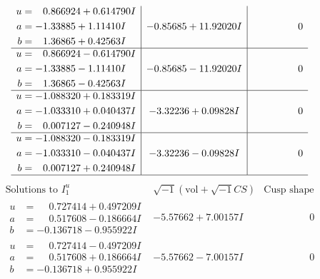 \documentclass[1p]{elsarticle_modified}
\theoremstyle{definition}
\newcommand{\I}{\sqrt{-1}}
\begin{document}
$$\begin{array}{c|c|c}
\begin{aligned}
u &= \phantom{-}0.866924 + 0.614790 I \\
a &= -1.33885 + 1.11410 I \\
b &= \phantom{-}1.36865 + 0.42563 I\end{aligned}
 & -0.85685 + 11.92020 I & \phantom{-0.000000 } 0 \\ \hline\begin{aligned}
u &= \phantom{-}0.866924 - 0.614790 I \\
a &= -1.33885 - 1.11410 I \\
b &= \phantom{-}1.36865 - 0.42563 I\end{aligned}
 & -0.85685 - 11.92020 I & \phantom{-0.000000 } 0 \\ \hline\begin{aligned}
u &= -1.088320 + 0.183319 I \\
a &= -1.033310 + 0.040437 I \\
b &= \phantom{-}0.007127 - 0.240948 I\end{aligned}
 & -3.32236 + 0.09828 I & \phantom{-0.000000 } 0 \\ \hline\begin{aligned}
u &= -1.088320 - 0.183319 I \\
a &= -1.033310 - 0.040437 I \\
b &= \phantom{-}0.007127 + 0.240948 I\end{aligned}
 & -3.32236 - 0.09828 I & \phantom{-0.000000 } 0\\
 \hline 
 \end{array}$$\newpage$$\begin{array}{c|c|c}  
\text{Solutions to }I^u_{1}& \I (\text{vol} + \sqrt{-1}CS) & \text{Cusp shape}\\
 \hline 
\begin{aligned}
u &= \phantom{-}0.727414 + 0.497209 I \\
a &= \phantom{-}0.517608 - 0.186664 I \\
b &= -0.136718 - 0.955922 I\end{aligned}
 & -5.57662 + 7.00157 I & \phantom{-0.000000 } 0 \\ \hline\begin{aligned}
u &= \phantom{-}0.727414 - 0.497209 I \\
a &= \phantom{-}0.517608 + 0.186664 I \\
b &= -0.136718 + 0.955922 I\end{aligned}
 & -5.57662 - 7.00157 I & \phantom{-0.000000 } 0 \\ \hline\begin{aligned}

\end{aligned}
\end{array}$$
\end{document}
